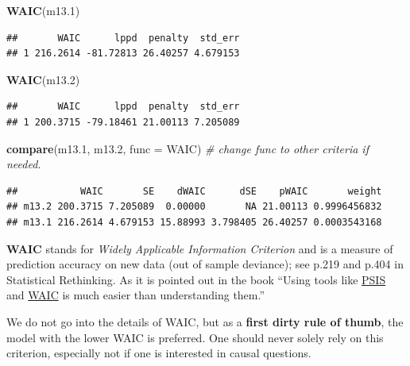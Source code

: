 \documentclass[
]{article}
\newenvironment{Shaded}{\begin{snugshade}}{\end{snugshade}}
\newcommand{\AttributeTok}[1]{\textcolor[rgb]{0.13,0.29,0.53}{#1}}
\newcommand{\CommentTok}[1]{\textcolor[rgb]{0.56,0.35,0.01}{\textit{#1}}}
\newcommand{\FloatTok}[1]{\textcolor[rgb]{0.00,0.00,0.81}{#1}}
\newcommand{\FunctionTok}[1]{\textcolor[rgb]{0.13,0.29,0.53}{\textbf{#1}}}
\newcommand{\NormalTok}[1]{#1}
\begin{document}
\begin{Shaded}
\begin{Highlighting}[]
\FunctionTok{WAIC}\NormalTok{(m13}\FloatTok{.1}\NormalTok{)}
\end{Highlighting}
\end{Shaded}

\begin{verbatim}
##       WAIC      lppd  penalty  std_err
## 1 216.2614 -81.72813 26.40257 4.679153
\end{verbatim}

\begin{Shaded}
\begin{Highlighting}[]
\FunctionTok{WAIC}\NormalTok{(m13}\FloatTok{.2}\NormalTok{)}
\end{Highlighting}
\end{Shaded}

\begin{verbatim}
##       WAIC      lppd  penalty  std_err
## 1 200.3715 -79.18461 21.00113 7.205089
\end{verbatim}

\begin{Shaded}
\begin{Highlighting}[]
\FunctionTok{compare}\NormalTok{(m13}\FloatTok{.1}\NormalTok{, m13}\FloatTok{.2}\NormalTok{, }\AttributeTok{func =}\NormalTok{ WAIC) }\CommentTok{\# change func to other criteria if needed.}
\end{Highlighting}
\end{Shaded}

\begin{verbatim}
##           WAIC       SE    dWAIC      dSE    pWAIC       weight
## m13.2 200.3715 7.205089  0.00000       NA 21.00113 0.9996456832
## m13.1 216.2614 4.679153 15.88993 3.798405 26.40257 0.0003543168
\end{verbatim}

\textbf{WAIC} stands for \emph{Widely Applicable Information Criterion}
and is a measure of prediction accuracy on new data (out of sample
deviance); see p.219 and p.404 in Statistical Rethinking. As it is
pointed out in the book ``Using tools like
\href{https://sites.stat.columbia.edu/gelman/research/unpublished/VehtariGelmanGabry_PSIS_2017.pdf}{PSIS}
and
\href{https://en.wikipedia.org/wiki/Watanabe\%E2\%80\%93Akaike_information_criterion}{WAIC}
is much easier than understanding them.''

We do not go into the details of WAIC, but as a \textbf{first dirty rule
of thumb}, the model with the lower WAIC is preferred. One should never
solely rely on this criterion, especially not if one is interested in
causal questions.
\end{document}
